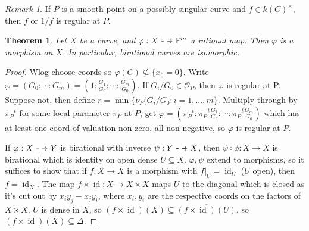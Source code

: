 \documentclass{article}
\theoremstyle{definition}
\theoremstyle{remark}
\newtheorem{rem}{Remark}
\theoremstyle{plain}
\newtheorem{thm}[defn]{Theorem}
\newcommand{\PP}{\mathbb{P}}
\newcommand{\id}{\operatorname{id}}
\newcommand\dashto{\mathrel{
  -\mkern-6mu{\to}\mkern-20mu{\color{white}\bullet}\mkern12mu
}}
\begin{document}
\begin{rem}
    If $P$ is a smooth point on a possibly singular curve and $f\in k(C)^\times$, then $f$ or $1/f$ is regular at $P$.
\end{rem}
\begin{thm}
    Let $X$ be a curve, and $\varphi:X\dashto \PP^m$ a rational map. Then $\varphi$ is a morphism on $X$. In particular, birational curves are isomorphic.
\end{thm}
\begin{proof}
    Wlog choose coords so $\varphi(C)\not\subseteq\{x_0=0\}$. Write $\varphi=(G_0:\cdots:G_m)=(1:\frac{G_1}{G_0}:\cdots:\frac{G_m}{G_0})$. If $G_i/G_0\in\mathcal O_P$, then $\varphi$ is regular at P. Suppose not, then define $r=\min\{\nu_P(G_i/G_0:i=1,...,m\}$. Multiply through by $\pi_P^{-t}$ for some local parameter $\pi_P$ at $P$, get $\varphi=(\pi_P^{-t}:\pi_P^{-t}\frac{G_1}{G_0}:\cdots:\pi_P^{-t}\frac{G_{m}}{G_0})$ which has at least one coord of valuation non-zero, all non-negative, so $\varphi$ is regular at $P$.

    If $\varphi:X\dashto Y$ is birational with inverse $\psi:Y\dashto X$, then $\psi\circ\phi:X\to X$ is birational which is identity on open dense $U\subseteq X$. $\varphi,\psi$ extend to morphisms, so it suffices to show that if $f:X\to X$ is a morphism with $f|_U=\id_U$ ($U$ open), then $f=\id_X$. The map $f\times \id:X\to X\times X$ maps $U$ to the diagonal which is closed as it's cut out by $x_iy_j-x_jy_i$, where $x_i,y_i$ are the respective coords on the factors of $X\times X$. $U$ is dense in $X$, so $(f\times \id)(X)\subseteq \overline{(f\times \id)(U)}$, so $(f\times \id )(X)\subseteq\Delta$. 
\end{proof}
\end{document}
